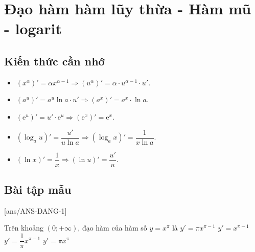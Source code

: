 \setcounter{ex}{0}
\section{Đạo hàm hàm lũy thừa - Hàm mũ - logarit}
\subsection{Kiến thức cần nhớ}
\begin{khung}
	\begin{itemize}
		\item $\left(x^\alpha\right)'=\alpha x^{\alpha -1} \Rightarrow \left(u^\alpha\right)'=\alpha\cdot u^{\alpha -1}\cdot u'$.
		\item $(a^u)'=a^u \ln a \cdot u'\Rightarrow (a^x)'=a^x \cdot \ln a $.
		\item $(\mathrm{e}^u)'=u'\cdot \mathrm{e}^u \Rightarrow (\mathrm{e}^x)'=\mathrm{e}^x$.
		\item $( \log_a u)'=\dfrac{u'}{u\ln a} \Rightarrow (\log_a x)'=\dfrac{1}{x \ln a}$.
		\item $\left(\ln x\right)'=\dfrac{1}{x} \Rightarrow (\ln u)'=\dfrac{u'}{u}$.
	\end{itemize}

\end{khung}
\subsection{Bài tập mẫu}
[ans/ANS-DANG-1]
\begin{khung}
	\begin{vd}%
			Trên khoảng $(0; +\infty)$, đạo hàm của hàm số $y=x^\pi$ là
			\choice
			{\True $y'=\pi x^{\pi-1}$}
			{$y'=x^{\pi-1}$}
			{$y'=\dfrac1\pi x^{\pi-1}$}
			{$y'=\pi x^\pi$}
	\end{vd}
\end{khung}
